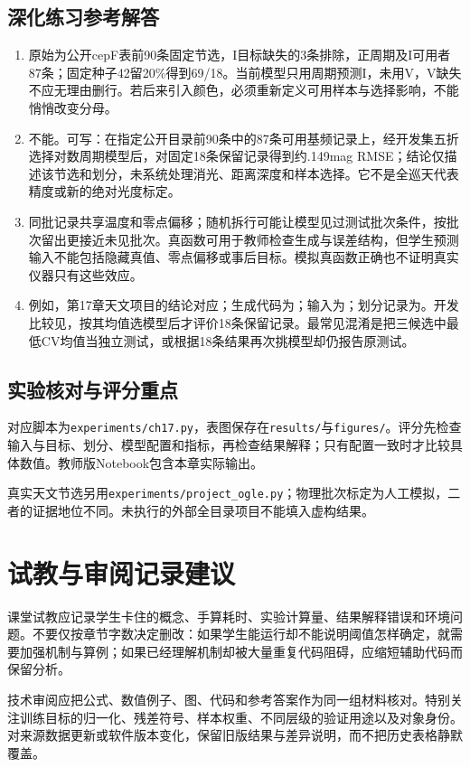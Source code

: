 \section*{深化练习参考解答}
\begin{enumerate}[label=D\arabic*.]
\item 原始为公开cepF表前90条固定节选，I目标缺失的3条排除，正周期及I可用者87条；固定种子42留20\%得到69/18。当前模型只用周期预测I，未用V，V缺失不应无理由删行。若后来引入颜色，必须重新定义可用样本与选择影响，不能悄悄改变分母。
\item 不能。可写：在指定公开目录前90条中的87条可用基频记录上，经开发集五折选择对数周期模型后，对固定18条保留记录得到约.149mag RMSE；结论仅描述该节选和划分，未系统处理消光、距离深度和样本选择。它不是全巡天代表精度或新的绝对光度标定。
\item 同批记录共享温度和零点偏移；随机拆行可能让模型见过测试批次条件，按批次留出更接近未见批次。真函数可用于教师检查生成与误差结构，但学生预测输入不能包括隐藏真值、零点偏移或事后目标。模拟真函数正确也不证明真实仪器只有这些效应。
\item 例如，第17章天文项目的结论对应；生成代码为；输入为；划分记录为。开发比较见，按其均值选模型后才评价18条保留记录。最常见混淆是把三候选中最低CV均值当独立测试，或根据18条结果再次挑模型却仍报告原测试。
\end{enumerate}

\section*{实验核对与评分重点}
对应脚本为\texttt{experiments/ch17.py}，表图保存在\texttt{results/}与\texttt{figures/}。评分先检查输入与目标、划分、模型配置和指标，再检查结果解释；只有配置一致时才比较具体数值。教师版Notebook包含本章实际输出。

真实天文节选另用\texttt{experiments/project\_ogle.py}；物理批次标定为人工模拟，二者的证据地位不同。未执行的外部全目录项目不能填入虚构结果。

\backmatter
\chapter*{试教与审阅记录建议}
课堂试教应记录学生卡住的概念、手算耗时、实验计算量、结果解释错误和环境问题。不要仅按章节字数决定删改：如果学生能运行却不能说明阈值怎样确定，就需要加强机制与算例；如果已经理解机制却被大量重复代码阻碍，应缩短辅助代码而保留分析。

技术审阅应把公式、数值例子、图、代码和参考答案作为同一组材料核对。特别关注训练目标的归一化、残差符号、样本权重、不同层级的验证用途以及对象身份。对来源数据更新或软件版本变化，保留旧版结果与差异说明，而不把历史表格静默覆盖。
